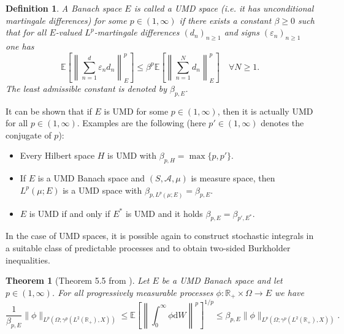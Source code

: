 \documentclass[10pt]{article}
\newcommand{\mathd}{\mathrm{d}}
\newtheorem{definition}{Definition}
\newtheorem{theorem}{Theorem}
\begin{document}
\begin{definition}
  \label{appendixA3 defn UMD} A Banach space $E$ is called a UMD space (i.e.
  it has unconditional martingale differences) for some $p \in (1, \infty)$ if
  there exists a constant $\beta \geqslant 0$ such that for all
  $E$\mbox{-}valued $L^p$\mbox{-}martingale differences $(d_n)_{n \geqslant
  1}$ and signs $(\varepsilon_n)_{n \geqslant 1}$ one has
  \[ \mathbb{E} \left[ \left\| \sum_{n = 1}^d \varepsilon_n d_n \right\|_E^p
     \right] \leqslant \beta^p \mathbb{E} \left[ \left\| \sum_{n = 1}^N d_n
     \right\|_E^p \right] \quad \forall N \geqslant 1. \]
  The least admissible constant is denoted by $\beta_{p, E}$.
\end{definition}

It can be shown that if $E$ is UMD for some $p \in (1, \infty)$, then it is
actually UMD for all $p \in (1, \infty)$. Examples are the following (here $p'
\in (1, \infty)$ denotes the conjugate of $p$):
\begin{itemize}
  \item Every Hilbert space $H$ is UMD with $\beta_{p, H} = \max \{ p, p' \}$.
  
  \item If $E$ is a UMD Banach space and $(S, \mathcal{A}, \mu)$ is measure
  space, then $L^p (\mu ; E)$ is a UMD space with $\beta_{p, L^p (\mu ; E)} =
  \beta_{p, E}$.
  
  \item $E$ is UMD if and only if $E^{\ast}$ is UMD and it holds $\beta_{p, E}
  = \beta_{p', E^{\ast}}$.
\end{itemize}
In the case of UMD spaces, it is possible again to construct stochastic
integrals in a suitable class of predictable processes and to obtain two-sided
Burkholder inequalities.

\begin{theorem}[Theorem 5.5 from {\cite{vanneerven2015}}]
  \label{appendixA3 burkholder UMD}Let $E$ be a UMD Banach space and let $p
  \in (1, \infty)$. For all progressively measurable processes $\phi :
  \mathbb{R}_+ \times \Omega \rightarrow E$ we have
  \[ \frac{1}{\beta_{p, E}} \| \phi \|_{L^p (\Omega ; \gamma^p (L^2
     (\mathbb{R}_+), X))} \leqslant \mathbb{E} \left[ \left\| \int_0^{\infty}
     \phi \mathd W \right\|^p \right]^{1 / p} \leqslant \beta_{p, E} \| \phi
     \|_{L^p (\Omega ; \gamma^p (L^2 (\mathbb{R}_+), X))} . \]
\end{theorem}
\end{document}
